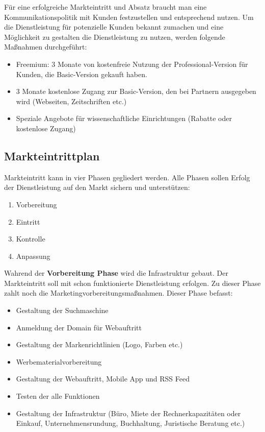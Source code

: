 Für eine erfolgreiche Markteintritt und Absatz braucht man eine Kommunikationspolitik mit Kunden festzustellen und entsprechend nutzen. Um die Dienstleistung für potenzielle Kunden bekannt zumachen und eine Möglichkeit zu gestalten die Dienstleistung zu nutzen, werden folgende Maßnahmen durchgeführt: 
\begin{itemize}
\item Freemium: 3 Monate von kostenfreie Nutzung der Professional-Version für Kunden, die Basic-Version gekauft haben.
\item 3 Monate kostenlose Zugang zur Basic-Version, den bei Partnern ausgegeben wird (Webseiten, Zeitschriften etc.)
\item Speziale Angebote für wissenschaftliche Einrichtungen (Rabatte oder kostenlose Zugang)
\end{itemize}

\subsection{Markteintrittplan}

Markteintritt kann in vier Phasen gegliedert werden. Alle Phasen sollen Erfolg der Dienstleistung auf den Markt sichern und unterstützen: 
\begin{enumerate} 
\item Vorbereitung
\item Eintritt 
\item Kontrolle 
\item Anpassung 
\end{enumerate}

Wahrend der \textbf{Vorbereitung Phase} wird die Infrastruktur gebaut. Der Markteintritt soll mit schon funktionierte Dienstleistung erfolgen. Zu dieser Phase zahlt noch die Marketingvorbereitungsmaßnahmen. Dieser Phase befasst:
\begin{itemize}
\item Gestaltung der Suchmaschine
\item Anmeldung der Domain für Webauftritt
\item Gestaltung der Markenrichtlinien (Logo, Farben etc.)
\item Werbematerialvorbereitung
\item Gestaltung der Webauftritt, Mobile App und RSS Feed 
\item Testen der alle Funktionen 
\item Gestaltung der Infrastruktur (Büro, Miete der Rechnerkapazitäten oder Einkauf, Unternehmensrundung, Buchhaltung, Juristische Beratung etc.)
\end{itemize}

